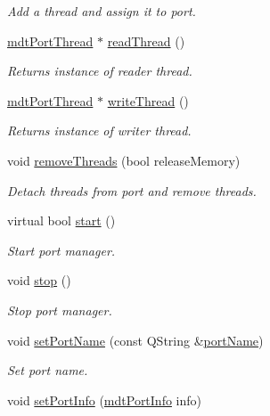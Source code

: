 \begin{DoxyCompactItemize}
\begin{DoxyCompactList}\small\item\em Add a thread and assign it to port. \end{DoxyCompactList}\item 
\hyperlink{classmdt_port_thread}{mdt\-Port\-Thread} $\ast$ \hyperlink{classmdt_port_manager_ad9233b5156a45f2684783317d75fdf9b}{read\-Thread} ()
\begin{DoxyCompactList}\small\item\em Returns instance of reader thread. \end{DoxyCompactList}\item 
\hyperlink{classmdt_port_thread}{mdt\-Port\-Thread} $\ast$ \hyperlink{classmdt_port_manager_af44b6e9876e6687b1d4fe7e05ffd5a91}{write\-Thread} ()
\begin{DoxyCompactList}\small\item\em Returns instance of writer thread. \end{DoxyCompactList}\item 
void \hyperlink{classmdt_port_manager_aaa0a474183bcae0fff4fb9ef43023c25}{remove\-Threads} (bool release\-Memory)
\begin{DoxyCompactList}\small\item\em Detach threads from port and remove threads. \end{DoxyCompactList}\item 
virtual bool \hyperlink{classmdt_port_manager_af1fb103ffafc227337a59c7e82f44fbc}{start} ()
\begin{DoxyCompactList}\small\item\em Start port manager. \end{DoxyCompactList}\item 
void \hyperlink{classmdt_port_manager_aacbf87cc3d9c37c87e21696f8a6514bd}{stop} ()
\begin{DoxyCompactList}\small\item\em Stop port manager. \end{DoxyCompactList}\item 
void \hyperlink{classmdt_port_manager_a2b2ed690cbba9f544c6ac1b46684e59a}{set\-Port\-Name} (const Q\-String \&\hyperlink{classmdt_port_manager_af4fcab6aaad98d74aeabfc972da1d406}{port\-Name})
\begin{DoxyCompactList}\small\item\em Set port name. \end{DoxyCompactList}\item 
void \hyperlink{classmdt_port_manager_a7e2ef93ec2731e66aa2b2d5f7ce9bc1c}{set\-Port\-Info} (\hyperlink{classmdt_port_info}{mdt\-Port\-Info} info)

\end{DoxyCompactItemize}
